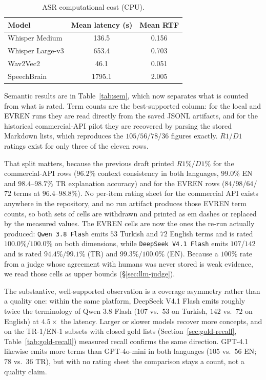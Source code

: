 \documentclass[conference]{IEEEtran}
\begin{document}
\begin{table}[t]
\caption{ASR computational cost (CPU).}
\label{tab:rtf}
\centering
\renewcommand{\arraystretch}{1.15}
\begin{tabular}{lcc}
\toprule
\textbf{Model} & \textbf{Mean latency (s)} & \textbf{Mean RTF} \\
\midrule
Whisper Medium & 136.5 & 0.156 \\
Whisper Large-v3 & 653.4 & 0.703 \\
Wav2Vec2 & 46.1 & 0.051 \\
SpeechBrain & 1795.1 & 2.005 \\
\bottomrule
\end{tabular}
\end{table}

Semantic results are in Table~\ref{tab:sem}, which now separates what is counted from what is rated. Term counts are the best-supported column: for the local and EVREN runs they are read directly from the saved JSONL artifacts, and for the historical commercial-API pilot they are recovered by parsing the stored Markdown lists, which reproduces the $105$/$56$/$78$/$36$ figures exactly. $R1$/$D1$ ratings exist for only three of the eleven rows.

That split matters, because the previous draft printed $R1\%/D1\%$ for the commercial-API rows ($96.2\%$ context consistency in both languages, $99.0\%$ EN and $98.4$--$98.7\%$ TR explanation accuracy) and for the EVREN rows ($84$/$98$/$64$/$72$ terms at $96.4$--$98.8\%$). No per-item rating sheet for the commercial API exists anywhere in the repository, and no run artifact produces those EVREN term counts, so both sets of cells are withdrawn and printed as em dashes or replaced by the measured values. The EVREN cells are now the ones the re-run actually produced: \texttt{Qwen 3.8 Flash} emits $53$ Turkish and $72$ English terms and is rated $100.0\%/100.0\%$ on both dimensions, while \texttt{DeepSeek V4.1 Flash} emits $107$/$142$ and is rated $94.4\%/99.1\%$ (TR) and $99.3\%$/$100.0\%$ (EN). Because a $100\%$ rate from a judge whose agreement with humans was never stored is weak evidence, we read those cells as upper bounds (\S\ref{sec:llm-judge}).

The substantive, well-supported observation is a coverage asymmetry rather than a quality one: within the same platform, DeepSeek V4.1 Flash emits roughly twice the terminology of Qwen 3.8 Flash ($107$ vs.\ $53$ on Turkish, $142$ vs.\ $72$ on English) at $4.5\times$ the latency. Larger or slower models recover more concepts, and on the TR-1/EN-1 subsets with closed gold lists (Section~\ref{sec:gold-recall}, Table~\ref{tab:gold-recall}) measured recall confirms the same direction. GPT-4.1 likewise emits more terms than GPT-4o-mini in both languages ($105$ vs.\ $56$ EN; $78$ vs.\ $36$ TR), but with no rating sheet the comparison stays a count, not a quality claim.
\end{document}
